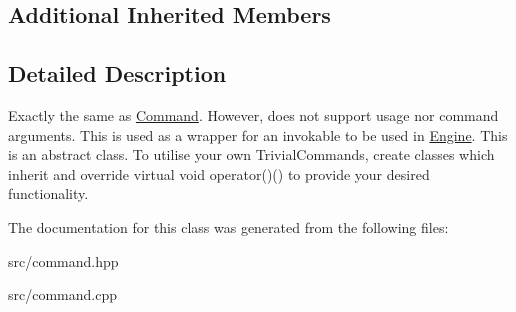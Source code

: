 \subsection*{Additional Inherited Members}


\subsection{Detailed Description}
Exactly the same as \mbox{\hyperlink{class_command}{Command}}. However, does not support \textquotesingle{}usage\textquotesingle{} nor command arguments. This is used as a wrapper for an invokable to be used in \mbox{\hyperlink{class_engine}{Engine}}. This is an abstract class. To utilise your own Trivial\+Commands, create classes which inherit and override virtual void operator()() to provide your desired functionality. 

The documentation for this class was generated from the following files\+:\begin{DoxyCompactItemize}
\item 
src/command.\+hpp\item 
src/command.\+cpp\end{DoxyCompactItemize}
